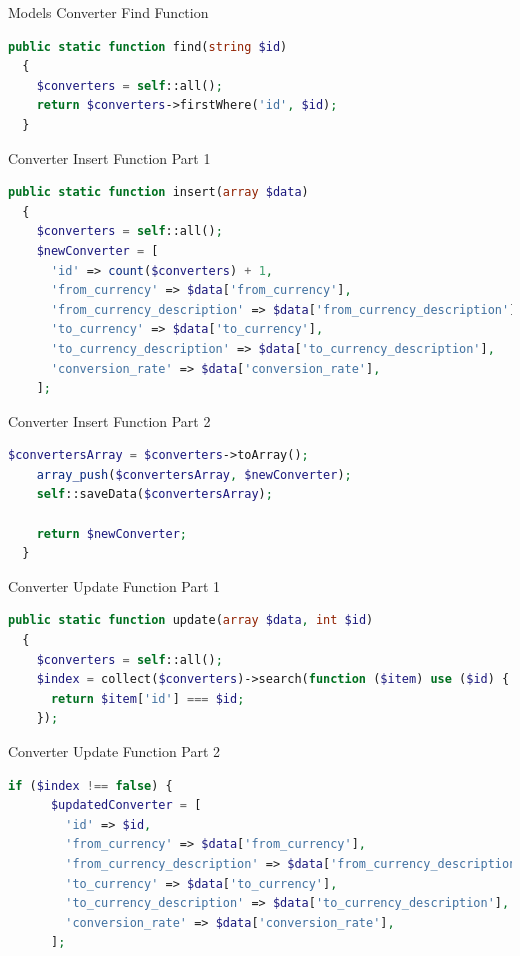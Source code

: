\documentclass[aspectratio=169, table]{beamer}
\begin{document}
\begin{frame}[fragile]{Models Converter Find Function}
\vskip1cm
\begin{lstlisting}[language=PHP]
public static function find(string $id)
  {
    $converters = self::all();
    return $converters->firstWhere('id', $id);
  }
\end{lstlisting}
\end{frame}

\begin{frame}[fragile]{Converter Insert Function Part 1}
\vskip1cm
\begin{lstlisting}[language=PHP]
public static function insert(array $data)
  {
    $converters = self::all();
    $newConverter = [
      'id' => count($converters) + 1,
      'from_currency' => $data['from_currency'],
      'from_currency_description' => $data['from_currency_description'],
      'to_currency' => $data['to_currency'],
      'to_currency_description' => $data['to_currency_description'],
      'conversion_rate' => $data['conversion_rate'],
    ];
\end{lstlisting}
\end{frame}

\begin{frame}[fragile]{Converter Insert Function Part 2}
\vskip1cm
\begin{lstlisting}[language=PHP]
    $convertersArray = $converters->toArray();
    array_push($convertersArray, $newConverter);
    self::saveData($convertersArray);

    return $newConverter;
  }
\end{lstlisting}
\end{frame}

\begin{frame}[fragile]{Converter Update Function Part 1}
\vskip1cm
\begin{lstlisting}[language=PHP]
public static function update(array $data, int $id)
  {
    $converters = self::all();
    $index = collect($converters)->search(function ($item) use ($id) {
      return $item['id'] === $id;
    });
\end{lstlisting}
\end{frame}

\begin{frame}[fragile]{Converter Update Function Part 2}
\vskip1cm
\begin{lstlisting}[language=PHP]
 if ($index !== false) {
      $updatedConverter = [
        'id' => $id,
        'from_currency' => $data['from_currency'],
        'from_currency_description' => $data['from_currency_description'],
        'to_currency' => $data['to_currency'],
        'to_currency_description' => $data['to_currency_description'],
        'conversion_rate' => $data['conversion_rate'],
      ];
\end{lstlisting}
\end{frame}
\end{document}
